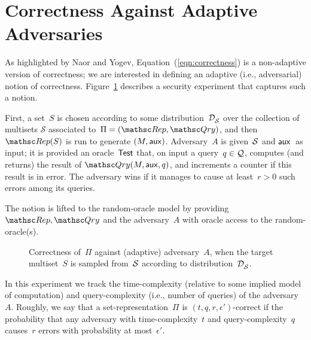 \section{Correctness Against Adaptive Adversaries}
As highlighted by Naor and Yogev, Equation~(\ref{eqn:correctness}) is a non-adaptive version of correctness;
we are interested in defining an adaptive (i.e., adversarial) notion
of correctness.   Figure~\ref{fig:correctness} describes a security
experiment that captures such a notion.

First, a set~$S$ is chosen according to some
distribution~$\mathcal{D}_{{\cal S}}^{}$ over the collection of multisets
$\mathcal{S}$ associated to~$\Pi=(\Rep,\Qry)$, and then
$\Rep(S)$ is run to generate $(M,{\sf aux})$.
Adversary~$A$ is given~${\cal S}$ and ${\sf aux}$~as input; it is
provided an oracle~$\mathsf{Test}$ that, on input a query~$q \in {\cal Q}$,
computes (and returns) the result of $\Qry(M,\aux,q)$, and increments
a counter if this result is in error.  The adversary wins if it
manages to cause at least~$r>0$ such errors among its queries.

The notion is lifted to the random-oracle model by providing
$\Rep,\Qry$ and the adversary~$A$ with oracle access to the
random-oracle(s).



\begin{figure}[htp]
\centering
{}
\caption{Correctness of~$\Pi$ against (adaptive) adversary~$A$, when
  the target multiset~$S$ is sampled from~${\cal S}$ according to distribution~$\mathcal{D}_{{\cal S}}^{}$.} 
\label{fig:correctness}
\end{figure}

In this experiment we track the time-complexity (relative to some
implied model of computation) and query-complexity (i.e., number of
queries) of the adversary~$A$.  Roughly, we say that a
set-representation~$\Pi$ is $(t,q,r,\epsilon')$-correct if the
probability that any adversary with time-complexity~$t$ and
query-complexity~$q$ causes~$r$ errors with probability at
most~$\epsilon'$.  


